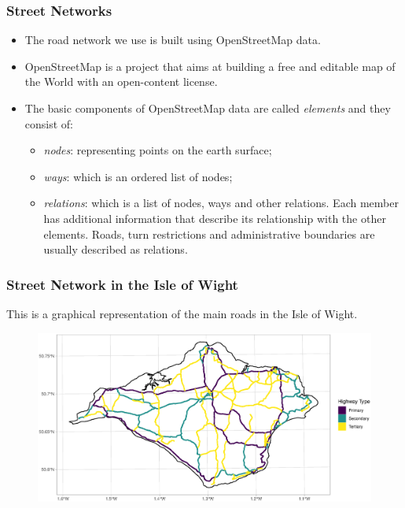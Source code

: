 \documentclass[c,10pt,pdftex]{beamer}
\begin{document}
\begin{frame}
\frametitle{Street Networks}
\vspace{-0.75cm}
\begin{itemize}
  \setlength\itemsep{1em}
  \item The road network we use is built using OpenStreetMap data. 
  \item OpenStreetMap is a project that aims at building a free and editable map of the World with an open-content license. 
  \item The basic components of OpenStreetMap data are called \textit{elements} and they consist of: 
  \begin{itemize}
    \setlength\itemsep{0.25em}
    \item \textit{nodes}: representing points on the earth surface; 
    \item \textit{ways}: which is an ordered list of nodes; 
    \item \textit{relations}: which is a list of nodes, ways and other relations. Each member has additional information that describe its relationship with the other elements. Roads, turn restrictions and administrative boundaries are usually described as relations.
  \end{itemize}
\end{itemize}
\end{frame}

\begin{frame}
\frametitle{Street Network in the Isle of Wight}
This is a graphical representation of the main roads in the Isle of Wight. 
\vspace{-0.75cm}
\begin{figure}
\centering
\includegraphics[width = 1.05\linewidth]{images/highway_type}
\end{figure}
\end{frame}
\end{document}
